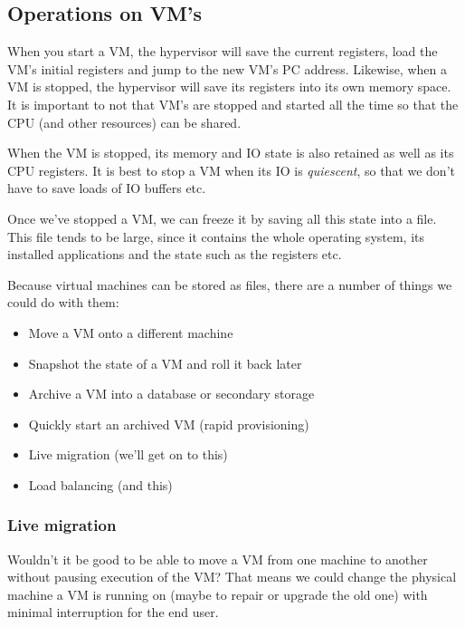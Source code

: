 \subsection{Operations on VM's}

When you start a VM, the hypervisor will save the current registers, load the
VM's initial registers and jump to the new VM's PC address. Likewise, when a VM
is stopped, the hypervisor will save its registers into its own memory space. It
is important to not that VM's are stopped and started all the time so that the
CPU (and other resources) can be shared.

When the VM is stopped, its memory and IO state is also retained as well as its
CPU registers. It is best to stop a VM when its IO is \textit{quiescent}, so
that we don't have to save loads of IO buffers etc.

Once we've stopped a VM, we can freeze it by saving all this state into a file.
This file tends to be large, since it contains the whole operating system, its
installed applications and the state such as the registers etc.

Because virtual machines can be stored as files, there are a number of things we
could do with them:

\begin{mymulticols}
  \begin{itemize}
    \item Move a VM onto a different machine
    \item Snapshot the state of a VM and roll it back later
    \item Archive a VM into a database or secondary storage
    \item Quickly start an archived VM (rapid provisioning)
    \item Live migration (we'll get on to this)
    \item Load balancing (and this)
  \end{itemize}
\end{mymulticols}

\subsubsection{Live migration}

Wouldn't it be good to be able to move a VM from one machine to another without
pausing execution of the VM? That means we could change the physical machine a
VM is running on (maybe to repair or upgrade the old one) with minimal
interruption for the end user.

